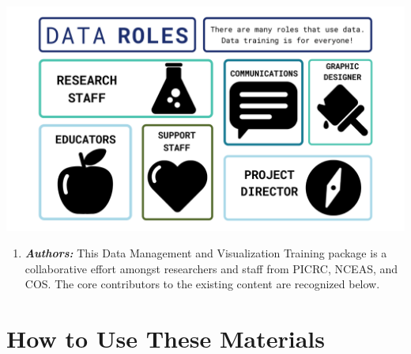\documentclass[
]{book}
\providecommand{\tightlist}{%
  \setlength{\itemsep}{0pt}\setlength{\parskip}{0pt}}
\begin{document}
\includegraphics{images/Data_Roles.png}

\begin{enumerate}
\def\labelenumi{\arabic{enumi}.}
\setcounter{enumi}{4}
\tightlist
\item
  \textbf{\emph{Authors:}} This Data Management and Visualization Training package is a collaborative effort amongst researchers and staff from PICRC, NCEAS, and COS. The core contributors to the existing content are recognized below.
\end{enumerate}

\hypertarget{how-to-use-these-materials}{%
\section{How to Use These Materials}\label{how-to-use-these-materials}}
\end{document}
